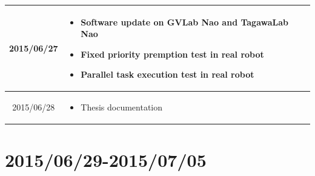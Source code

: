 \documentclass[11pt]{article} %
\begin{document}
\begin{center}
\begin{longtable}{ | c | p{6cm} | p{5cm} |}
  2015/06/27         & 
  \begin{itemize}
  \item Software update on GVLab Nao and TagawaLab Nao
  \item Fixed priority premption test in real robot
  \item Parallel task execution test in real robot
\end{itemize}   
  & 
\\  										 \hline							

  2015/06/28         & 
  \begin{itemize}
  \item Thesis documentation
\end{itemize}   
  & 
\\  										 \hline				 							 
  										   								 
    \end{longtable}
\end{center}

\newpage
\section{2015/06/29-2015/07/05}
\end{document}
